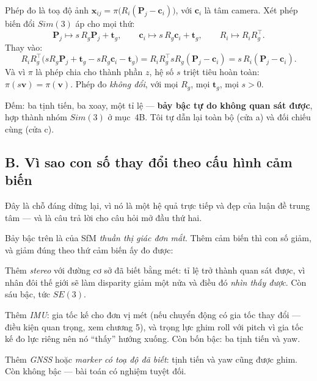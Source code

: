 \documentclass[../../vslam.tex]{subfiles}
\begin{document}
Phép đo là toạ độ ảnh \(\mathbf{x}_{ij} = \pi\bigl(R_i(\mathbf{P}_j - \mathbf{c}_i)\bigr)\), với \(\mathbf{c}_i\) là tâm camera. Xét phép biến đổi \(Sim(3)\) áp cho mọi thứ:
\[
\mathbf{P}_j \mapsto s\,R_g\mathbf{P}_j + \mathbf{t}_g,
\qquad
\mathbf{c}_i \mapsto s\,R_g\mathbf{c}_i + \mathbf{t}_g,
\qquad
R_i \mapsto R_i R_g^{\top}.
\]
Thay vào:
\[
R_i R_g^{\top}\bigl(s R_g\mathbf{P}_j + \mathbf{t}_g - s R_g\mathbf{c}_i - \mathbf{t}_g\bigr)
= R_i R_g^{\top} s R_g(\mathbf{P}_j - \mathbf{c}_i)
= s\,R_i(\mathbf{P}_j - \mathbf{c}_i).
\]
Và vì \(\pi\) là phép chia cho thành phần \(z\), hệ số \(s\) triệt tiêu hoàn toàn: \(\pi(s\mathbf{v}) = \pi(\mathbf{v})\). Phép đo \emph{không đổi}, với mọi \(R_g\), mọi \(\mathbf{t}_g\), mọi \(s>0\).

Đếm: ba tịnh tiến, ba xoay, một tỉ lệ --- \textbf{bảy bậc tự do không quan sát được}, hợp thành nhóm \(Sim(3)\) ở  mục~4B. Tôi tự dẫn lại toàn bộ (cửa a) và đối chiếu \cite[§9]{triggs2000ba} cùng \cite{hartley2004} (cửa c).

\subsection{B. Vì sao con số thay đổi theo cấu hình cảm biến}

Đây là chỗ đáng dừng lại, vì nó là một hệ quả trực tiếp và đẹp của luận đề trung tâm --- và là câu trả lời cho câu hỏi mở đầu thứ hai.

Bảy bậc trên là của SfM \emph{thuần thị giác đơn mắt}. Thêm cảm biến thì con số giảm, và giảm đúng theo thứ cảm biến ấy đo được:

Thêm \emph{stereo} với đường cơ sở đã biết bằng mét: tỉ lệ trở thành quan sát được, vì nhân đôi thế giới sẽ làm disparity giảm một nửa và điều đó \emph{nhìn thấy được}. Còn sáu bậc, tức \(SE(3)\).

Thêm \emph{IMU}: gia tốc kế cho đơn vị mét (nếu chuyển động có gia tốc thay đổi --- điều kiện quan trọng, xem  chương 5), và trọng lực ghim roll với pitch vì gia tốc kế đo lực riêng nên nó ``thấy'' hướng xuống. Còn bốn bậc: ba tịnh tiến và yaw.

Thêm \emph{GNSS} hoặc \emph{marker có toạ độ đã biết}: tịnh tiến và yaw cũng được ghim. Còn không bậc --- bài toán có nghiệm tuyệt đối.
\end{document}
